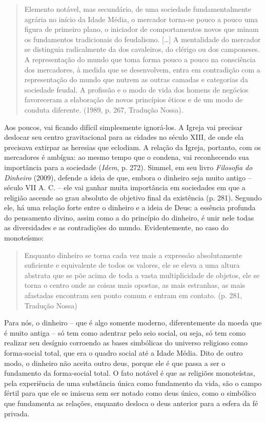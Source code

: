 \begin{quote}
Elemento notável, mas secundário, de uma sociedade fundamentalmente
agrária no início da Idade Média, o mercador torna-se pouco a pouco uma
figura de primeiro plano, o iniciador de comportamentos novos que minam
os fundamentos tradicionais do feudalismo. {[}\ldots{}{]} A mentalidade
do mercador se distinguia radicalmente da dos cavaleiros, do clérigo ou
dos camponeses. A representação do mundo que toma forma pouco a pouco na
consciência dos mercadores, à medida que se desenvolvem, entra em
contradição com a representação do mundo que nutrem as outras camadas e
categorias da sociedade feudal. A profissão e o modo de vida dos homens
de negócios favoreceram a elaboração de novos princípios éticos e de um
modo de conduta diferente. (1989, p. 267, Tradução Nossa).
\end{quote}

Aos poucos, vai ficando difícil simplesmente ignorá-los. A Igreja vai
precisar deslocar seu centro gravitacional para as cidades no século
XIII, de onde ela precisava extirpar as heresias que eclodiam. A relação
da Igreja, portanto, com os mercadores é ambígua: ao mesmo tempo que o
condena, vai reconhecendo sua importância para a sociedade (\emph{Idem},
p. 272). Simmel, em seu livro \emph{Filosofia do Dinheiro} (2009),
defende a ideia de que, embora o dinheiro seja muito antigo -- século
VII A. C. -- ele vai ganhar muita importância em sociedades em que a
religião ascende ao grau absoluto de objetivo final da existência (p.
281). Segundo ele, há uma relação forte entre o dinheiro e a ideia de
Deus: a essência profunda do pensamento divino, assim como a do
princípio do dinheiro, é unir nele todas as diversidades e as
contradições do mundo. Evidentemente, no caso do monoteísmo:

\begin{quote}
Enquanto dinheiro se torna cada vez mais a expressão absolutamente
suficiente e equivalente de todos os valores, ele se eleva a uma altura
abstrata que se põe acima de toda a vasta multiplicidade de objetos, ele
se torna o centro onde as coisas mais opostas, as mais estranhas, as
mais afastadas encontram seu ponto comum e entram em contato. (p. 281,
Tradução Nossa)
\end{quote}

Para nós, o dinheiro -- que é algo somente moderno, diferentemente da
moeda que é muito antiga -- só tem como adentrar pelo seio social, ou
seja, só tem como realizar seu desígnio corroendo as bases simbólicas do
universo religioso como forma-social total, que era o quadro social até
a Idade Média. Dito de outro modo, o dinheiro não aceita outro deus,
porque ele é que passa a ser o fundamento da forma-social total. O fato
notável é que as religiões monoteístas, pela experiência de uma
substância única como fundamento da vida, são o campo fértil para que
ele se imiscua sem ser notado como deus único, como o simbólico que
fundamenta as relações, enquanto desloca o deus anterior para a esfera
da fé privada.

